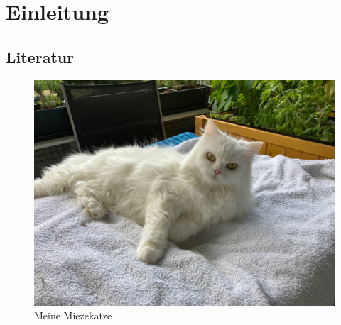 \chapter{Einleitung}
\section{Literatur}

\blindtext[20]


\begin{figure}
\includegraphics[width=\textwidth]{Bilder/Katze1}
\caption{Meine Miezekatze}\label{fig:katze1}
\end{figure}


